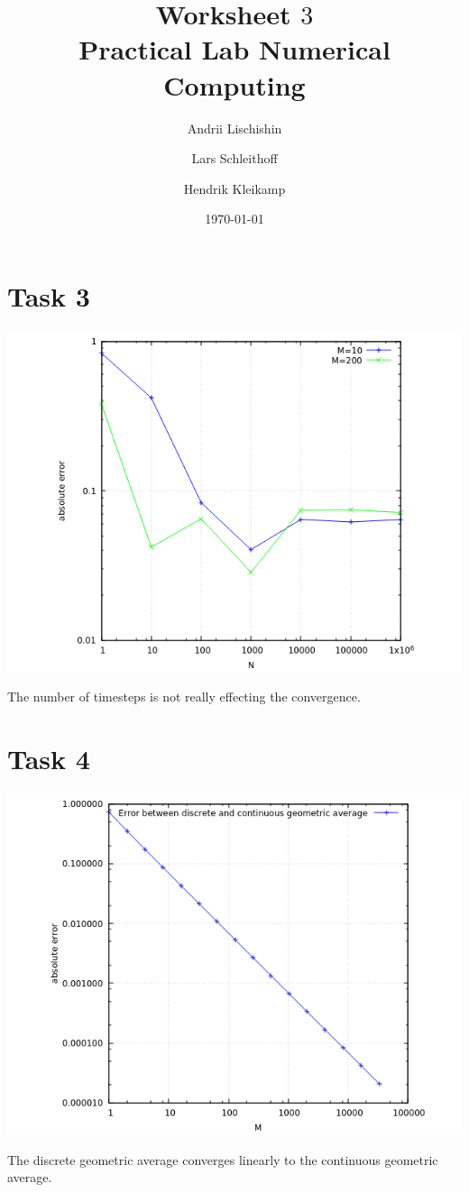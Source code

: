 \documentclass[10pt,a4paper]{article}
\begin{document}
\title{Worksheet $3$\\
\small{Practical Lab Numerical Computing}}
\author{Andrii Lischishin \and Lars Schleithoff \and Hendrik Kleikamp}
\date{\today}
\maketitle

\section*{Task 3}

\begin{center}
\includegraphics[scale=0.5]{error_task_3.png}
\end{center}
The number of timesteps is not really effecting the convergence.

\section*{Task 4}

\begin{center}
\includegraphics[scale=0.5]{error_continuous_discrete.png}		
\end{center}
The discrete geometric average converges linearly to the continuous geometric average.
\end{document}
